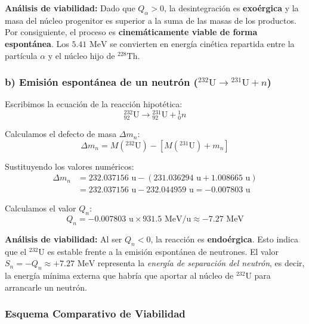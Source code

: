 \begin{problema}
\textbf{Análisis de viabilidad:} Dado que $Q_\alpha > 0$, la desintegración es \textbf{exoérgica} y la masa del núcleo progenitor es superior a la suma de las masas de los productos. Por consiguiente, el proceso es \textbf{cinemáticamente viable de forma espontánea}. Los $5.41\text{ MeV}$ se convierten en energía cinética repartida entre la partícula $\alpha$ y el núcleo hijo de ${}^{228}\text{Th}$.

\subsubsection*{b) Emisión espontánea de un neutrón (${}^{232}\text{U} \to {}^{231}\text{U} + n$)}

Escribimos la ecuación de la reacción hipotética:
\begin{equation}
{}_{92}^{232}\text{U} \longrightarrow {}_{92}^{231}\text{U} + {}_0^1 n
\end{equation}

Calculamos el defecto de masa $\Delta m_n$:
\begin{equation}
\Delta m_n = M({}^{232}\text{U}) - \left[ M({}^{231}\text{U}) + m_n \right]
\end{equation}

Sustituyendo los valores numéricos:
\begin{align}
\Delta m_n &= 232.037156\text{ u} - (231.036294\text{ u} + 1.008665\text{ u}) \nonumber \\
&= 232.037156\text{ u} - 232.044959\text{ u} = -0.007803\text{ u}
\end{align}

Calculamos el valor $Q_n$:
\begin{equation}
Q_n = -0.007803\text{ u} \times 931.5\text{ MeV/u} \approx -7.27\text{ MeV}
\end{equation}

\textbf{Análisis de viabilidad:} Al ser $Q_n < 0$, la reacción es \textbf{endoérgica}. Esto indica que el ${}^{232}\text{U}$ es estable frente a la emisión espontánea de neutrones. El valor $S_n = -Q_n \approx +7.27\text{ MeV}$ representa la \textit{energía de separación del neutrón}, es decir, la energía mínima externa que habría que aportar al núcleo de ${}^{232}\text{U}$ para arrancarle un neutrón.

\subsubsection*{Esquema Comparativo de Viabilidad}


\end{problema}
